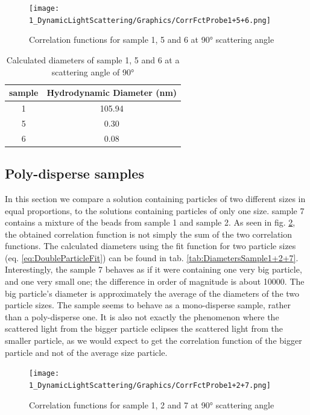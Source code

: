 \documentclass{article}
\begin{document}
\begin{figure}[!ht]
    \centering
    \texttt{[image: 1\_DynamicLightScattering/Graphics/CorrFctProbe1+5+6.png]}
    \caption{Correlation functions for sample 1, 5 and 6 at 90° scattering angle}
    \label{fig:Probe1+5+6}
\end{figure}
\FloatBarrier

\begin{table}[!ht]
    \centering
    \begin{tabular}{|c|c|}
    \hline
        sample & Hydrodynamic Diameter (nm) \\ \hline \hline
        1 & 105.94 \\ \hline
        5 & 0.30 \\ \hline
        6 & 0.08 \\ \hline
    \end{tabular}
    \caption{Calculated diameters of sample 1, 5 and 6 at a scattering angle of 90°}
    \label{tab:DiametersSample1+5+6}
\end{table}

\subsection{Poly-disperse samples}

In this section we compare a solution containing particles of two different sizes in equal proportions, to the solutions containing particles of only one size. sample 7 contains a mixture of the beads from sample 1 and sample 2. As seen in fig. \ref{fig:Probe1+2+7}, the obtained correlation function is not simply the sum of the two correlation functions. The calculated diameters using the fit function for two particle sizes (eq. \ref{eq:DoubleParticleFit}) can be found in tab. \ref{tab:DiametersSample1+2+7}. Interestingly, the sample 7 behaves as if it were containing one very big particle, and one very small one; the difference in order of magnitude is about 10000. The big particle's diameter is approximately the average of the diameters of the two particle sizes. The sample seems to behave as a mono-disperse sample, rather than a poly-disperse one. It is also not exactly the phenomenon where the scattered light from the bigger particle eclipses the scattered light from the smaller particle, as we would expect to get the correlation function of the bigger particle and not of the average size particle.

\begin{figure}[!ht]
    \centering
    \texttt{[image: 1\_DynamicLightScattering/Graphics/CorrFctProbe1+2+7.png]}
    \caption{Correlation functions for sample 1, 2 and 7 at 90° scattering angle}
    \label{fig:Probe1+2+7}
\end{figure}
\FloatBarrier
\end{document}
